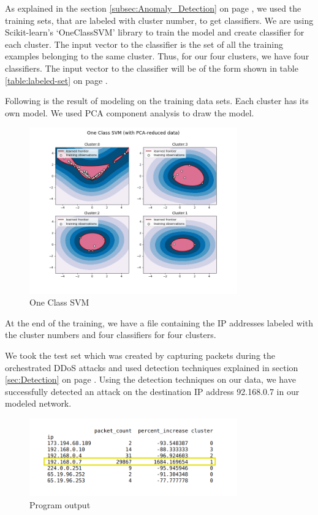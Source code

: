 \documentclass[12pt,oneside,a4paper]{article}
\begin{document}
As explained in the section \ref{subsec:Anomaly_Detection} on page \pageref{subsec:Anomaly_Detection}, we used the training sets, that are labeled with cluster number, to get classifiers. We are using Scikit-learn's `OneClassSVM' library to train the model and create classifier for each cluster. The input vector to the classifier is the set of all the training examples belonging to the same cluster. Thus, for our four clusters, we have four classifiers. The input vector to the classifier will be of the form shown in table \ref{table:labeled-set} on page \pageref{table:labeled-set}.

Following is the result of modeling on the training data sets. Each cluster has its own model. We used PCA component analysis to draw the model.

\begin{figure}[H]
\centering
\includegraphics[width=0.80\textwidth]{one-class-SVM.png}
\caption{One Class SVM} \label{fig:one-class-SVM}
\end{figure}

At the end of the training, we have a file containing the IP addresses labeled with the cluster numbers and four classifiers for four clusters.

We took the test set which was created by capturing packets during the orchestrated DDoS attacks and used detection techniques explained in section \ref{sec:Detection} on page \pageref{sec:Detection}. Using the detection techniques on our data, we have successfully detected an attack on the destination IP address 92.168.0.7 in our modeled network.

\begin{figure}[H]
\centering
\includegraphics[width=0.80\textwidth]{detected_IP.png}
\caption{Program output} \label{fig:detected_IP}
\end{figure}
\pagebreak
\end{document}
